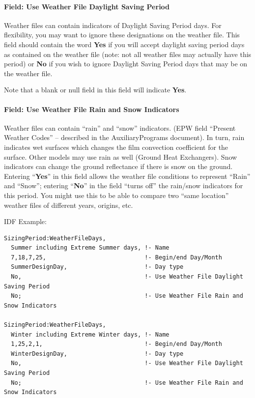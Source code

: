 \paragraph{Field: Use Weather File Daylight Saving Period}\label{field-use-weather-file-daylight-saving-period}

Weather files can contain indicators of Daylight Saving Period days. For flexibility, you may want to ignore these designations on the weather file. This field should contain the word \textbf{Yes} if you will accept daylight saving period days as contained on the weather file (note: not all weather files may actually have this period) or \textbf{No} if you wish to ignore Daylight Saving Period days that may be on the weather file.

Note that a blank or null field in this field will indicate \textbf{Yes}.

\paragraph{Field: Use Weather File Rain and Snow Indicators}\label{field-use-weather-file-rain-and-snow-indicators}

Weather files can contain ``rain'' and ``snow'' indicators. (EPW field ``Present Weather Codes'' -- described in the AuxiliaryPrograms document). In turn, rain indicates wet surfaces which changes the film convection coefficient for the surface. Other models may use rain as well (Ground Heat Exchangers). Snow indicators can change the ground reflectance if there is snow on the ground. Entering ``\textbf{Yes}'' in this field allows the weather file conditions to represent ``Rain'' and ``Snow''; entering ``\textbf{No}'' in the field ``turns off'' the rain/snow indicators for this period. You might use this to be able to compare two ``same location'' weather files of different years, origins, etc.

IDF Example:

\begin{lstlisting}
SizingPeriod:WeatherFileDays,
  Summer including Extreme Summer days, !- Name
  7,18,7,25,                            !- Begin/end Day/Month
  SummerDesignDay,                      !- Day type
  No,                                   !- Use Weather File Daylight Saving Period
  No;                                   !- Use Weather File Rain and Snow Indicators

SizingPeriod:WeatherFileDays,
  Winter including Extreme Winter days, !- Name
  1,25,2,1,                             !- Begin/end Day/Month
  WinterDesignDay,                      !- Day type
  No,                                   !- Use Weather File Daylight Saving Period
  No;                                   !- Use Weather File Rain and Snow Indicators
\end{lstlisting}

